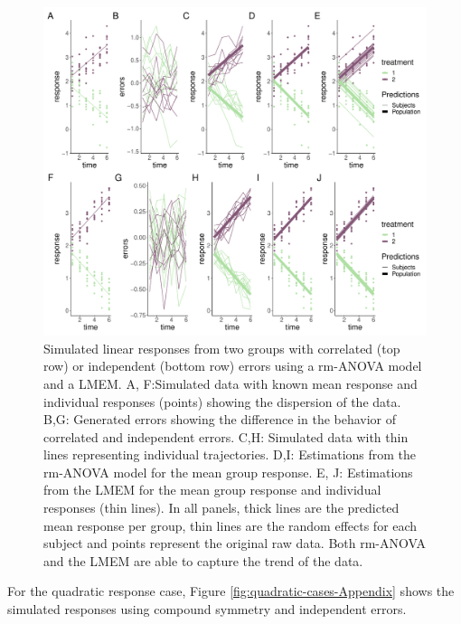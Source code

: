 \documentclass[
]{article}
\begin{document}
\begin{figure}

{\centering \includegraphics[width=1\linewidth]{SIM_Appendix_files/figure-latex/linear-cases-Appendix-1} 

}

\caption{Simulated linear responses from two groups with correlated (top row) or independent (bottom row) errors using a rm-ANOVA model and a LMEM. A, F:Simulated data with known mean response and individual responses (points) showing the dispersion of the data. B,G: Generated errors showing the difference in the behavior of correlated and independent errors. C,H: Simulated data with thin lines representing individual trajectories. D,I: Estimations from the rm-ANOVA model for the mean group response. E, J: Estimations from the LMEM for the mean group response and individual responses (thin lines). In all panels, thick lines are the predicted mean response per group, thin lines are the random effects for each subject and points represent the original raw data. Both rm-ANOVA and the LMEM are able to capture the trend of the data.}\label{fig:linear-cases-Appendix}
\end{figure}

For the quadratic response case, Figure \ref{fig:quadratic-cases-Appendix} shows the simulated responses using compound symmetry and independent errors.
\end{document}
